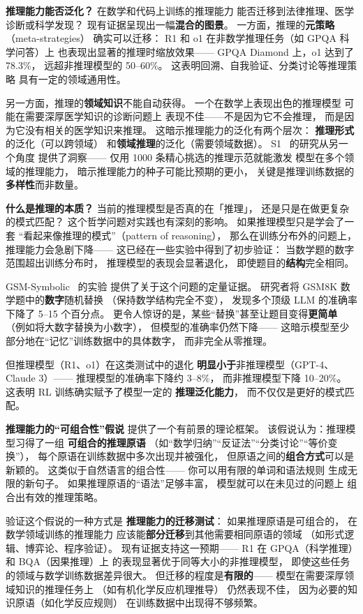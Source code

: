 \textbf{推理能力能否泛化？}
在数学和代码上训练的推理能力
能否迁移到法律推理、医学诊断或科学发现？
现有证据呈现出一幅\textbf{混合的图景}。
一方面，推理的\textbf{元策略}（meta-strategies）
确实可以迁移：
R1 和 o1 在非数学推理任务（如 GPQA 科学问答）上
也表现出显著的推理时缩放效果——
GPQA Diamond 上，o1 达到了 78.3\%，
远超非推理模型的 50--60\%。
这表明回溯、自我验证、分类讨论等推理策略
具有一定的领域通用性。

另一方面，推理的\textbf{领域知识}不能自动获得。
一个在数学上表现出色的推理模型
可能在需要深厚医学知识的诊断问题上
表现不佳——不是因为它不会推理，
而是因为它没有相关的医学知识来推理。
这暗示推理能力的泛化有两个层次：
\textbf{推理形式}的泛化（可以跨领域）
和\textbf{领域推理}的泛化（需要领域数据）。
S1~\cite{muennighoff2025s1} 的研究从另一个角度
提供了洞察——
仅用 1000 条精心挑选的推理示范就能激发
模型在多个领域的推理能力，
暗示推理能力的种子可能比预期的更小，
关键是推理训练数据的\textbf{多样性}而非数量。

\textbf{什么是推理的本质？}
当前的推理模型是否真的在「推理」，
还是只是在做更复杂的模式匹配？
这个哲学问题对实践也有深刻的影响。
如果推理模型只是学会了一套
“看起来像推理的模式”（pattern of reasoning），
那么在训练分布外的问题上，
推理能力会急剧下降——
这已经在一些实验中得到了初步验证：
当数学题的数字范围超出训练分布时，
推理模型的表现会显著退化，
即使题目的\textbf{结构}完全相同。

GSM-Symbolic~\cite{mirzadeh2024gsmsymbolic} 的实验
提供了关于这个问题的定量证据。
研究者将 GSM8K 数学题中的\textbf{数字}随机替换
（保持数学结构完全不变），
发现多个顶级 LLM 的准确率
下降了 5--15 个百分点。
更令人惊讶的是，某些“替换”甚至让题目变得\textbf{更简单}
（例如将大数字替换为小数字），
但模型的准确率仍然下降——
这暗示模型至少部分地在“记忆”训练数据中的具体数字，
而非完全从零推理。

但推理模型（R1、o1）在这类测试中的退化
\textbf{明显小于}非推理模型（GPT-4、Claude 3）——
推理模型的准确率下降约 3--8\%，
而非推理模型下降 10--20\%。
这表明 RL 训练确实赋予了模型一定的
\textbf{推理泛化能力}，
而不仅仅是更好的模式匹配。

\textbf{推理能力的“可组合性”假说}
提供了一个有前景的理论框架。
该假说认为：推理模型习得了一组
\textbf{可组合的推理原语}
（如“数学归纳”“反证法”“分类讨论”“等价变换”），
每个原语在训练数据中多次出现并被强化，
但原语之间的\textbf{组合方式}可以是新颖的。
这类似于自然语言的组合性——
你可以用有限的单词和语法规则
生成无限的新句子。
如果推理原语的“语法”足够丰富，
模型就可以在未见过的问题上
组合出有效的推理策略。

验证这个假说的一种方式是
\textbf{推理能力的迁移测试}：
如果推理原语是可组合的，
在数学领域训练的推理能力
应该能\textbf{部分迁移}到其他需要相同原语的领域
（如形式逻辑、博弈论、程序验证）。
现有证据支持这一预期——
R1 在 GPQA（科学推理）和 BQA（因果推理）上
的表现显著优于同等大小的非推理模型，
即使这些任务的领域与数学训练数据差异很大。
但迁移的程度是\textbf{有限的}——
模型在需要深厚领域知识的推理任务上
（如有机化学反应机理推导）
仍然表现不佳，
因为必要的知识原语（如化学反应规则）
在训练数据中出现得不够频繁。

